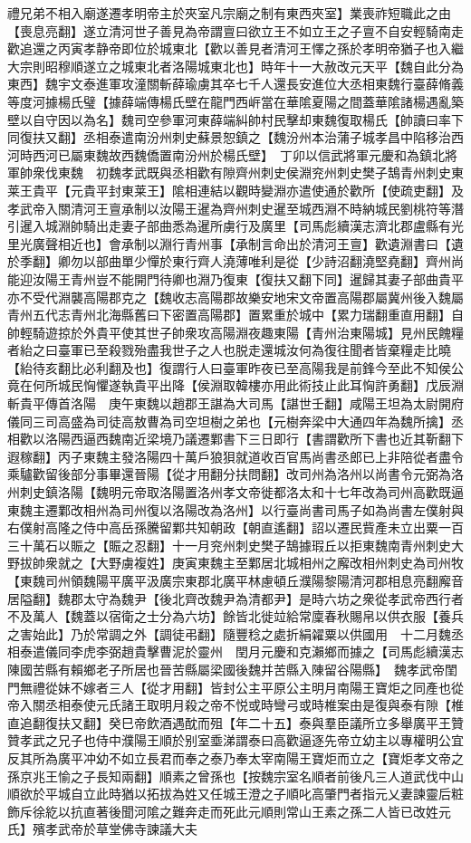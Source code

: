 禮兄弟不相入廟遂遷孝明帝主於夾室凡宗廟之制有東西夾室】業喪祚短職此之由【喪息亮翻】遂立清河世子善見為帝謂亶曰欲立王不如立王之子亶不自安輕騎南走歡追還之丙寅孝静帝即位於城東北【歡以善見者清河王懌之孫於孝明帝猶子也入繼大宗則昭穆順遂立之城東北者洛陽城東北也】時年十一大赦改元天平【魏自此分為東西】魏宇文泰進軍攻潼關斬薛瑜虜其卒七千人還長安進位大丞相東魏行臺薛脩義等度河據楊氏璧【據薛端傳楊氏壁在龍門西㟁當在華隂夏陽之間蓋華隂諸楊遇亂築壁以自守因以為名】魏司空參軍河東薛端糾帥村民擊却東魏復取楊氏【帥讀曰率下同復扶又翻】丞相泰遣南汾州刺史蘇景恕鎮之【魏汾州本治蒲子城孝昌中陷移治西河時西河已屬東魏故西魏僑置南汾州於楊氏壁】　丁卯以信武將軍元慶和為鎮北將軍帥衆伐東魏　初魏孝武既與丞相歡有隙齊州刺史侯淵兖州刺史樊子鵠青州刺史東莱王貴平【元貴平封東莱王】隂相連結以觀時變淵亦遣使通於歡所【使疏吏翻】及孝武帝入關清河王亶承制以汝陽王暹為齊州刺史暹至城西淵不時納城民劉桃符等潛引暹入城淵帥騎出走妻子部曲悉為暹所虜行及廣里【司馬彪續漢志濟北郡盧縣有光里光廣聲相近也】會承制以淵行青州事【承制言命出於清河王亶】歡遺淵書曰【遺於季翻】卿勿以部曲單少憚於東行齊人澆薄唯利是從【少詩沼翻澆堅堯翻】齊州尚能迎汝陽王青州豈不能開門待卿也淵乃復東【復扶又翻下同】暹歸其妻子部曲貴平亦不受代淵襲高陽郡克之【魏收志高陽郡故樂安地宋文帝置高陽郡屬冀州後入魏屬青州五代志青州北海縣舊曰下密置高陽郡】置累重於城中【累力瑞翻重直用翻】自帥輕騎遊掠於外貴平使其世子帥衆攻高陽淵夜趣東陽【青州治東陽城】見州民餽糧者紿之曰臺軍已至殺戮殆盡我世子之人也脱走還城汝何為復往聞者皆棄糧走比曉【紿待亥翻比必利翻及也】復謂行人曰臺軍昨夜已至高陽我是前鋒今至此不知侯公竟在何所城民恟懼遂執貴平出降【侯淵取韓樓亦用此術技止此耳恟許勇翻】戊辰淵斬貴平傳首洛陽　庚午東魏以趙郡王諶為大司馬【諶世壬翻】咸陽王坦為太尉開府儀同三司高盛為司徒高敖曹為司空坦樹之弟也【元樹奔梁中大通四年為魏所擒】丞相歡以洛陽西逼西魏南近梁境乃議遷鄴書下三日即行【書謂歡所下書也近其靳翻下遐稼翻】丙子東魏主發洛陽四十萬戶狼狽就道收百官馬尚書丞郎已上非陪從者盡令乘驢歡留後部分事畢還晉陽【從才用翻分扶問翻】改司州為洛州以尚書令元弼為洛州刺史鎮洛陽【魏明元帝取洛陽置洛州孝文帝徙都洛太和十七年改為司州高歡既逼東魏主遷鄴改相州為司州復以洛陽改為洛州】以行臺尚書司馬子如為尚書左僕射與右僕射高隆之侍中高岳孫騰留鄴共知朝政【朝直遙翻】詔以遷民貲產未立出粟一百三十萬石以賑之【賑之忍翻】十一月兖州刺史樊子鵠據瑕丘以拒東魏南青州刺史大野拔帥衆就之【大野虜複姓】庚寅東魏主至鄴居北城相州之廨改相州刺史為司州牧【東魏司州領魏陽平廣平汲廣宗東郡北廣平林慮頓丘濮陽黎陽清河郡相息亮翻廨音居隘翻】魏郡太守為魏尹【後北齊改魏尹為清都尹】是時六坊之衆從孝武帝西行者不及萬人【魏蓋以宿衛之士分為六坊】餘皆北徙竝給常廩春秋賜帛以供衣服【養兵之害始此】乃於常調之外【調徒弔翻】隨豐稔之處折絹糴粟以供國用　十二月魏丞相泰遣儀同李虎李弼趙貴擊曹泥於靈州　閏月元慶和克瀨鄉而據之【司馬彪續漢志陳國苦縣有賴鄉老子所居也晉苦縣屬梁國後魏并苦縣入陳留谷陽縣】　魏孝武帝閨門無禮從妹不嫁者三人【從才用翻】皆封公主平原公主明月南陽王寶炬之同產也從帝入關丞相泰使元氏諸王取明月殺之帝不悦或時彎弓或時椎案由是復與泰有隙【椎直追翻復扶又翻】癸巳帝飲酒遇酖而殂【年二十五】泰與羣臣議所立多舉廣平王贊贊孝武之兄子也侍中濮陽王順於别室埀涕謂泰曰高歡逼逐先帝立幼主以專權明公宜反其所為廣平冲幼不如立長君而奉之泰乃奉太宰南陽王寶炬而立之【寶炬孝文帝之孫京兆王愉之子長知兩翻】順素之曾孫也【按魏宗室名順者前後凡三人道武伐中山順欲於平城自立此時猶以拓拔為姓又任城王澄之子順叱高肇門者指元乂妻諫靈后粧飾斥徐紇以抗直著後聞河隂之難奔走而死此元順則常山王素之孫二人皆已改姓元氏】殯孝武帝於草堂佛寺諫議大夫